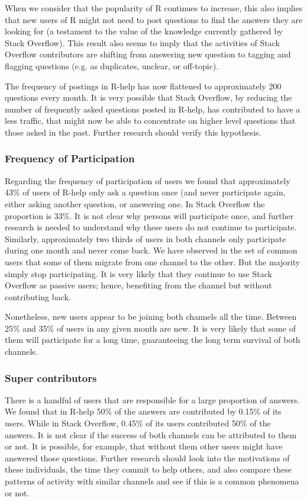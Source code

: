 \documentclass[smallextended]{svjour3}       %
\newcommand{\SO}{Stack Overflow\xspace}
\newcommand{\RH}{R-help\xspace}
\begin{document}
When we consider that the popularity of R continues to increase, this also implies that new users of R might not need to
post questions to find the answers they are looking for (a testament to the value of the knowledge currently gathered by
\SO). This result also seems to imply that the activities of \SO contributors are shifting from answering new question to
tagging and flagging questions  (e.g. as  duplicates, unclear, or off-topic).

The frequency of postings in \RH has now flattened to approximately 200 questions every month. It is very possible that
\SO, by reducing the number of frequently asked questions posted in \RH, has contributed to have a less traffic, that
might now be able to concentrate on higher level questions that those asked in the past. Further research should verify
this hypothesis.


\subsubsection{Frequency of Participation}

Regarding the frequency of participation of users we found that approximately 43\% of users of \RH only ask a question
once (and never participate again, either asking another question, or answering one. In
\SO the proportion is 33\%. It is not clear why persons will participate once, and further research is needed to
understand why these users do not continue to participate. Similarly, approximately two thirds of users in both channels
only participate during one month and never come back. We have observed in the set of common users that some of them
migrate from one channel to the other. But the majority simply stop participating. It is very likely that they continue
to use \SO as passive users; hence, benefiting from the channel but without contributing back.

Nonetheless, new users appear to be joining both channels all the time. Between 25\% and 35\% of users in any given month
are new. It is very likely that some of them will participate for a long time, guaranteeing the long term survival of
both channels.

\subsubsection{Super contributors}

There is a handful of users that are responsible for a large proportion of answers. We found that in \RH 50\% of the
answers are contributed by 0.15\% of its users. While in \SO, 0.45\% of its users contributed 50\% of the answers. It is
not clear if the success of both channels can be attributed to them or not. It is possible, for example, that without
them other users might have answered those questions. Further research should look into the motivations of these
individuals, the time they commit to help others, and also compare these patterns of activity with similar channels and
see if this is a common phenomena or not.
\end{document}
